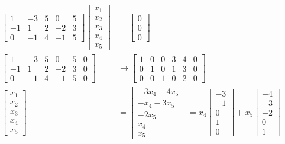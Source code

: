 \documentclass{math}
\begin{document}
\begin{align*}
  \begin{bmatrix}
    1 & -3 & 5 & 0 & 5 \\
    -1 & 1 & 2 & -2 & 3 \\
    0 & -1 & 4 & -1 & 5
  \end{bmatrix}\begin{bmatrix}
    x_1 \\ x_2 \\ x_3 \\ x_4 \\ x_5
  \end{bmatrix} &= \begin{bmatrix}0 \\ 0 \\ 0\end{bmatrix} \\
  \begin{bmatrix}
    1 & -3 & 5 & 0 & 5 & 0 \\
    -1 & 1 & 2 & -2 & 3 & 0 \\
    0 & -1 & 4 & -1 & 5 & 0
  \end{bmatrix} &\to \begin{bmatrix}
    1 & 0 & 0 & 3 & 4 & 0 \\
    0 & 1 & 0 & 1 & 3 & 0 \\
    0 & 0 & 1 & 0 & 2 & 0
  \end{bmatrix} \\
  \begin{bmatrix}
    x_1 \\ x_2 \\ x_3 \\ x_4 \\ x_5
  \end{bmatrix} &= \begin{bmatrix}
    -3x_4-4x_5 \\ -x_4-3x_5 \\ -2x_5 \\ x_4 \\ x_5
  \end{bmatrix} = x_4\begin{bmatrix}
    -3 \\ -1 \\ 0 \\ 1 \\ 0
  \end{bmatrix}+x_5\begin{bmatrix}
    -4 \\ -3 \\ -2 \\ 0 \\ 1

\end{bmatrix}
\end{align*}
\end{document}
